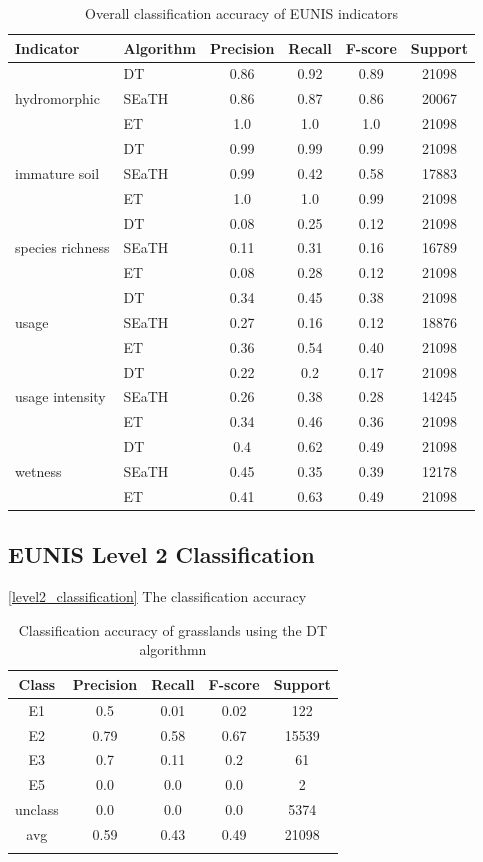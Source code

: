 \documentclass[authoryear, review,12pt,number]{elsarticle}
\begin{document}
\begin{table}
    \centering
    \begin{tabular}{l l c c c c}
    Indicator & Algorithm & Precision & Recall & F-score & 
Support\\
    \hline
    \multirow{3}{*}{hydromorphic}
    & DT & 0.86 & 0.92 & 0.89 & 21098\\
    & SEaTH & 0.86 & 0.87 & 0.86 & 20067\\
    & ET & 1.0 & 1.0 & 1.0 & 21098\\
    \cline{2-6}
    \multirow{3}{*}{immature soil}
    & DT & 0.99 & 0.99 & 0.99 & 21098\\
    & SEaTH & 0.99 & 0.42 & 0.58 & 17883\\
    & ET & 1.0 & 1.0 & 0.99 & 21098\\
    \multirow{3}{*}{species richness}
    & DT & 0.08 & 0.25 & 0.12 & 21098\\
    & SEaTH & 0.11 & 0.31 & 0.16 & 16789\\
    & ET & 0.08 & 0.28 & 0.12 & 21098\\
    \cline{2-6}
    \multirow{3}{*}{usage}
    & DT & 0.34 & 0.45 & 0.38 & 21098\\
    & SEaTH & 0.27 & 0.16 & 0.12 & 18876\\
    & ET & 0.36 & 0.54 & 0.40 & 21098\\
    \cline{2-6}
    \multirow{3}{*}{usage intensity}
    & DT & 0.22 & 0.2 & 0.17 & 21098\\
    & SEaTH & 0.26 & 0.38 & 0.28 & 14245\\
    & ET & 0.34 & 0.46 & 0.36 & 21098\\
    \cline{2-6}
    \multirow{3}{*}{wetness}
    & DT & 0.4 & 0.62 & 0.49 & 21098\\
    & SEaTH & 0.45 & 0.35 & 0.39 & 12178\\
    & ET & 0.41 & 0.63 & 0.49 & 21098\\
    \end{tabular}
    \caption{Overall classification accuracy of EUNIS indicators}
\end{table}

\subsection{EUNIS Level 2 Classification}
\ref{level2_classification}
The classification accuracy
\begin{table}
\begin{tabular}{c c c c c}
Class & Precision & Recall & F-score & Support\\
\hline
E1 & 0.5 & 0.01 & 0.02 & 122\\
E2 & 0.79 & 0.58 & 0.67 & 15539\\
E3 & 0.7 & 0.11 & 0.2 & 61\\
E5 & 0.0 & 0.0 & 0.0 & 2\\
unclass & 0.0 & 0.0 & 0.0 & 5374\\
avg & 0.59 & 0.43 & 0.49 & 21098\\
\label{fig_dt_lvl2_classification}
\end{tabular}
\caption{Classification accuracy of grasslands using the DT algorithmn}
\end{table}
\end{document}
